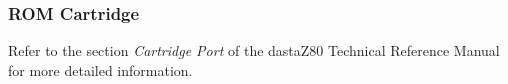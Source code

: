         \subsubsection{ROM Cartridge}

        Refer to the section \textit{Cartridge Port} of the dastaZ80 Technical
        Reference Manual\cite{dastaz80techman} for more detailed information.


